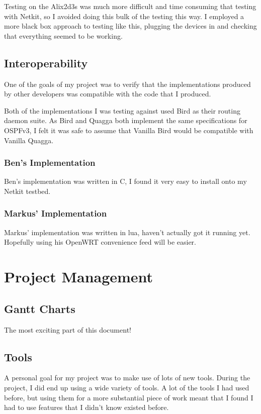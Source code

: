 \documentclass[12pt]{report}
\begin{document}
Testing on the Alix2d3s was much more difficult and time consuming that testing
with Netkit, so I avoided doing this bulk of the testing this way. I employed a
more black box approach to testing like this, plugging the devices in and
checking that everything seemed to be working. 

\section{Interoperability}
One of the goals of my project was to verify that the implementations produced
by other developers was compatible with the code that I produced. 

Both of the implementations I was testing against used Bird as their routing
daemon suite. As Bird and Quagga both implement the same specifications for
OSPFv3, I felt it was safe to assume that Vanilla Bird would be compatible with
Vanilla Quagga. 

\subsection{Ben's Implementation}
Ben's implementation was written in C, I found it very easy to install onto my
Netkit testbed. 

\subsection{Markus' Implementation}
Markus' implementation was written in lua, haven't actually got it running yet.
Hopefully using his OpenWRT convenience feed will be easier. 


\chapter{Project Management}

\section{Gantt Charts}
The most exciting part of this document!

\section{Tools}
A personal goal for my project was to make use of lots of new tools. During the
project, I did end up using a wide variety of tools. A lot of the tools I had
used before, but using them for a more substantial piece of work meant that I
found I had to use features that I didn't know existed before.
\end{document}
